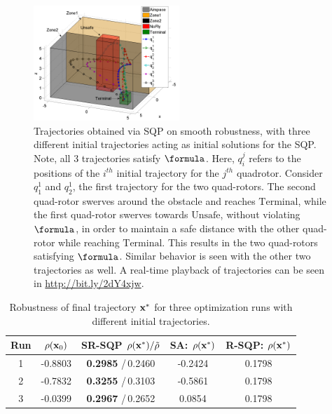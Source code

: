 \begin{figure}[t]
\centering
\includegraphics[width=0.49\textwidth]{figures/QuadTrajs_scissored}
\vspace{-10pt}
\caption{{\small Trajectories obtained via SQP on smooth robustness, with three different initial trajectories acting as initial solutions for the SQP. Note, all 3 trajectories satisfy $\formula$. Here, $q_{i}^j$ refers to the positions of the $i^{th}$ initial trajectory for the $j^{th}$ quadrotor. Consider $q_{1}^1$ and $q_{2}^1$, the first trajectory for the two quad-rotors. The second quad-rotor swerves around the obstacle and reaches $\text{Terminal}$, while the first quad-rotor swerves towards $\text{Unsafe}$, without violating $\formula$, in order to maintain a safe distance with the other quad-rotor while reaching $\text{Terminal}$. This results in the two quad-rotors satisfying $\formula$. Similar behavior is seen with the other two trajectories as well. A real-time playback of trajectories can be seen in \protect\url{http://bit.ly/2dY4xjw}.}}
\vspace{-10pt}
\label{fig:quad_ssqp}
\end{figure}


%
\begin{table}[htb]
\small
\begin{center}
\caption{{\small Robustness of final trajectory $\mathbf{x}^*$ for three optimization runs with different initial trajectories.}}
\vspace{-10pt}
\label{tbl:opt_performance}
\begin{tabular} {|c|c|c|c|c|}
	\hline
	\textbf{Run} & $\rho(\mathbf{x}_0) $ &SR-SQP $\rho(\mathbf{x}^*) /\tilde{\rho}$ & SA: $\rho(\mathbf{x}^*)$ & R-SQP: $\rho(\mathbf{x}^*)$\\ \hline
	1 & -0.8803 & \textbf{0.2985} /\,0.2460 & -0.2424 & 0.1798 \\ \hline
	2 & -0.7832 & \textbf{0.3255} /\,0.3103 & -0.5861 & 0.1798 \\ \hline
	3 & -0.0399 & \textbf{0.2967} /\,0.2652 & 0.0854 & 0.1798 \\ \hline
\end{tabular}	
\end{center}
\vspace{-20pt}
\end{table}


